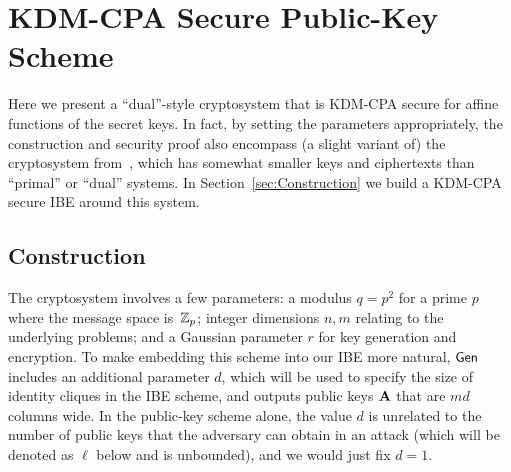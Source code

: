 \section{KDM-CPA Secure Public-Key Scheme}
\label{sec:KDMCPAscheme}

Here we present a ``dual''-style \lwe cryptosystem that is KDM-CPA
secure for affine functions of the secret keys.  In fact, by setting
the parameters appropriately, the construction and security proof also
encompass (a slight variant of) the cryptosystem
from~\cite{DBLP:conf/ctrsa/LindnerP11}, which has somewhat smaller
keys and ciphertexts than ``primal'' or ``dual'' systems.  In
Section~\ref{sec:Construction} we build a KDM-CPA secure IBE around
this system.

\subsection{Construction}

The cryptosystem involves a few parameters: a modulus $q=p^2$ for a
prime $p$ where the message space is~$\mathbb{Z}_p$; integer dimensions $n, m$
relating to the underlying \lwe problems; and a Gaussian parameter $r$
for key generation and encryption.  To make embedding this scheme into
our IBE more natural, $\mathsf{Gen}$ includes an additional parameter $d$,
which will be used to specify the size of identity cliques in the IBE
scheme, and outputs public keys $\mathbf{A}$ that are $md$ columns wide.  In
the public-key scheme alone, the value $d$ is unrelated to the number
of public keys that the adversary can obtain in an attack (which 
will be denoted as $\ell$ below and is
unbounded), and we would just fix $d=1$.

